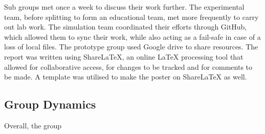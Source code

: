 Sub groups met once a week to discuss their work further. The experimental team, before splitting to form an educational team, met more frequently to carry out lab work. The simulation team coordinated their efforts through GitHub, which allowed them to sync their work, while also acting as a fail-safe in case of a loss of local files. The prototype group used Google drive to share resources. 
The report was written using ShareLaTeX, an online LaTeX processing tool that allowed for collaborative access, for changes to be tracked and for comments to be made. A template was utilised to make the poster on ShareLaTeX as well. 

\subsection{Group Dynamics}
Overall, the group 